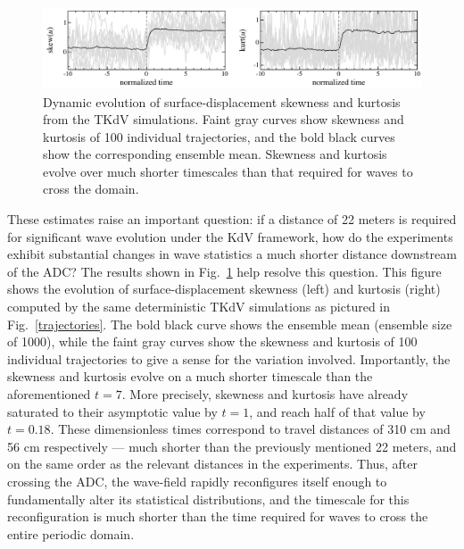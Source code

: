 \documentclass[11pt]{article}
\begin{document}
\begin{figure}%
\begin{center}
\includegraphics[width = 0.99 \linewidth]{Figs/skew-kurt.pdf}
\caption{
Dynamic evolution of surface-displacement skewness and kurtosis from the TKdV simulations. Faint gray curves show skewness and kurtosis of 100 individual trajectories, and the bold black curves show the corresponding ensemble mean. Skewness and kurtosis evolve over much shorter timescales than that required for waves to cross the domain.}
\label{skew-kurt}
\end{center}
\end{figure}
 
	These estimates raise an important question: if a distance of 22 meters is required for significant wave evolution under the KdV framework, how do the experiments exhibit substantial changes in wave statistics a much shorter distance downstream of the ADC? The results shown in Fig.~\ref{skew-kurt} help resolve this question. This figure shows the evolution of surface-displacement skewness (left) and kurtosis (right) computed by the same deterministic TKdV simulations as pictured in Fig.~\ref{trajectories}. The bold black curve shows the ensemble mean (ensemble size of 1000), while the faint gray curves show the skewness and kurtosis of 100 individual trajectories to give a sense for the variation involved. Importantly, the skewness and kurtosis evolve on a much shorter timescale than the aforementioned $t=7$. More precisely, skewness and kurtosis have already saturated to their asymptotic value by $t = 1$, and reach half of that value by $t = 0.18$. These dimensionless times correspond to travel distances of 310 cm and 56 cm respectively --- much shorter than the previously mentioned 22 meters, and on the same order as the relevant distances in the experiments. Thus, after crossing the ADC, the wave-field rapidly reconfigures itself enough to fundamentally alter its statistical distributions, and the timescale for this reconfiguration is much shorter than the time required for waves to cross the entire periodic domain.


\end{document}

